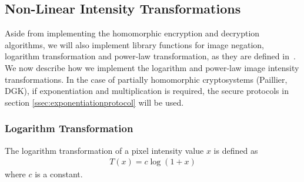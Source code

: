 
\subsection{Non-Linear Intensity Transformations}
Aside from implementing the homomorphic encryption and decryption algorithms, we will also implement library functions for image negation, logarithm transformation and power-law transformation, as they are defined in~\cite{gonzalez_digital_2008}.
We now describe how we implement the logarithm and power-law image intensity transformations. In the case of partially homomorphic cryptosystems (Paillier, DGK), if  exponentiation and multiplication is required, the secure protocols in section \ref{ssec:exponentiationprotocol} will be used.

\subsubsection{Logarithm Transformation}
The logarithm transformation of a pixel intensity value $x$ is defined as
\begin{align}
	T\left(x\right) = c \log\left(1 + x\right)
\end{align}
where $c$ is a constant.

